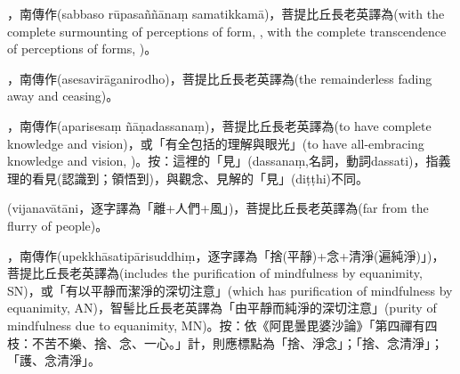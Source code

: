 \startitemgroup[noteitems]
\item{}，南傳作(sabbaso rūpasaññānaṃ samatikkamā)，菩提比丘長老英譯為(with the complete surmounting of perceptions of form, , with the complete transcendence of perceptions of forms, )。
\stopitemgroup

\startitemgroup[noteitems]
\item{}，南傳作(asesavirāganirodho)，菩提比丘長老英譯為(the remainderless fading away and ceasing)。
\stopitemgroup

\startitemgroup[noteitems]
\item{}，南傳作(aparisesaṃ ñāṇadassanaṃ)，菩提比丘長老英譯為(to have complete knowledge and vision)，或「有全包括的理解與眼光」(to have all-embracing knowledge and vision, )。按：這裡的「見」(dassanaṃ,名詞，動詞dassati)，指義理的看見(認識到；領悟到)，與觀念、見解的「見」(diṭṭhi)不同。
\stopitemgroup

\startitemgroup[noteitems]
\item{}(vijanavātāni，逐字譯為「離+人們+風」)，菩提比丘長老英譯為(far from the flurry of people)。
\stopitemgroup

\startitemgroup[noteitems]
\item{}，南傳作(upekkhāsatipārisuddhiṃ，逐字譯為「捨(平靜)+念+清淨(遍純淨)」)，菩提比丘長老英譯為(includes the purification of mindfulness by equanimity, SN)，或「有以平靜而潔淨的深切注意」(which has purification of mindfulness by equanimity, AN)，智髻比丘長老英譯為「由平靜而純淨的深切注意」(purity of mindfulness due to equanimity, MN)。按：依《阿毘曇毘婆沙論》「第四禪有四枝：不苦不樂、捨、念、一心。」計，則應標點為「捨、淨念」；「捨、念清淨」；「護、念清淨」。
\stopitemgroup

